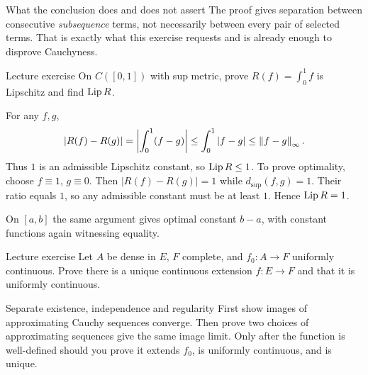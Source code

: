 \begin{note}{What the conclusion does and does not assert}
The proof gives separation between consecutive \emph{subsequence} terms, not necessarily between every pair of selected terms. That is exactly what this exercise requests and is already enough to disprove Cauchyness.
\end{note}
\begin{exam}{Lecture exercise}
On $C([0,1])$ with sup metric, prove $R(f)=\int_0^1f$ is Lipschitz and find $\operatorname{Lip} R$.
\end{exam}
\begin{answer}
For any $f,g$,
\[|R(f)-R(g)|=\left|\int_0^1(f-g)\right|\le\int_0^1|f-g|\le\left\lVert f-g\right\rVert_\infty.\]
Thus $1$ is an admissible Lipschitz constant, so $\operatorname{Lip} R\le1$. To prove optimality, choose $f\equiv1$, $g\equiv0$. Then $|R(f)-R(g)|=1$ while $d_{\sup}(f,g)=1$. Their ratio equals $1$, so any admissible constant must be at least $1$. Hence $\operatorname{Lip} R=1$.

On $[a,b]$ the same argument gives optimal constant $b-a$, with constant functions again witnessing equality.
\end{answer}
\begin{exam}{Lecture exercise}
Let $A$ be dense in $E$, $F$ complete, and $f_0:A\to F$ uniformly continuous. Prove there is a unique continuous extension $f:E\to F$ and that it is uniformly continuous.
\end{exam}
\begin{method}{Separate existence, independence and regularity}
First show images of approximating Cauchy sequences converge. Then prove two choices of approximating sequences give the same image limit. Only after the function is well-defined should you prove it extends $f_0$, is uniformly continuous, and is unique.
\end{method}
